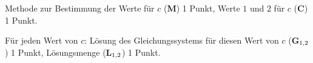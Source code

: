 \begin{bewertung}
\begin{teilaufgaben}
\item
Methode zur Bestimmung der Werte für $c$ ({\bf M}) 1 Punkt,
Werte $1$ und $2$ für $c$ ({\bf C}) 1 Punkt.
\item
Für jeden Wert von $c$: Lösung des Gleichungssystems für diesen Wert von $c$ 
({\bf G$\mathstrut_{1,2}$}) 1 Punkt, Lösungsmenge ({\bf L$\mathstrut_{1,2}$})
1 Punkt.
\end{teilaufgaben}
\end{bewertung}

